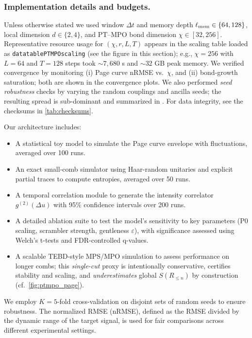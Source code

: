 \documentclass[aps,prd,preprint,onecolumn,superscriptaddress,nofootinbib,longbibliography,floatfix,11pt,showpacs,showkeys]{revtex4-2}
\theoremstyle{plain}
\theoremstyle{definition}
\theoremstyle{remark}
\begin{document}
\subsubsection{Implementation details and budgets.}
Unless otherwise stated we used window \(\Delta t\) and memory depth \(\ell_{\rm mem}\in\{64,128\}\), local dimension \(d\in\{2,4\}\), and PT--MPO bond dimension \(\chi\in[32,256]\).
Representative resource usage for \((\chi,r,L,T)\) appears in the scaling table loaded as \texttt{datatablePTMPOscaling} (see the figure in this section);
e.g., \(\chi=256\) with \(L=64\) and \(T=128\) steps took \(\sim 7{,}680\) s and \(\sim 32\) GB peak memory.
We verified convergence by monitoring (i) Page curve nRMSE vs.\ \(\chi\), and (ii) bond-growth saturation; both are shown in the convergence plots.
We also performed \emph{seed robustness} checks by varying the random couplings and ancilla seeds; the resulting spread is sub-dominant and summarized in .
For data integrity, see the checksums in \cref{tab:checksums}.

Our architecture includes:
\begin{itemize}[leftmargin=*]
    \item A statistical toy model to simulate the Page curve envelope with fluctuations, averaged over 100 runs.
    \item An exact small-comb simulator using Haar-random unitaries and explicit partial traces to compute entropies, averaged over 50 runs.
    \item A temporal correlation module to generate the intensity correlator $g^{(2)}(\Delta u)$ with 95\% confidence intervals over 200 runs.
    \item A detailed ablation suite to test the model's sensitivity to key parameters (P0 scaling, scrambler strength, gentleness $\varepsilon$), with significance assessed using Welch's t-tests and FDR-controlled q-values.
    \item A scalable TEBD-style MPS/MPO simulation to assess performance on longer combs; this \emph{single-cut} proxy is intentionally conservative, certifies stability and scaling, and \emph{underestimates} global $S(R_{\le n})$ by construction (cf.~\cref{fig:ptmpo_page}).
\end{itemize}
We employ $K=5$-fold cross-validation on disjoint sets of random seeds to ensure robustness. The normalized RMSE (nRMSE), defined as the RMSE divided by the dynamic range of the target signal, is used for fair comparisons across different experimental settings.
\end{document}

